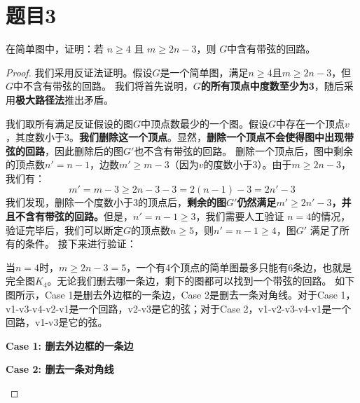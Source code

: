 \documentclass[utf8]{ctexart}
\theoremstyle{mystyle}
\begin{document}
\section*{题目3}
\begin{problembox}
在简单图中，证明：若 $ n \geq 4 $ 且 $ m \geq 2n -3 $，则 $ G $中含有带弦的回路。
\end{problembox}
\begin{proof}
我们采用反证法证明。假设$G$是一个简单图，满足$n \geq 4$且$m \geq 2n - 3$，但$G$中不含有带弦的回路。
我们将首先说明，\textbf{$G$的所有顶点中度数至少为3}，随后采用\textbf{极大路径法}推出矛盾。

我们取所有满足反证假设的图$G$中顶点数最少的一个图。假设$G$中存在一个顶点$v$，其度数小于3。\textbf{我们删除这一个顶点}。显然，\textbf{删除一个顶点不会使得图中出现带弦的回路}，因此删除后的图$ G' $也不含有带弦的回路。
删除一个顶点后，图中剩余的顶点数$n' = n-1$，边数$m' \geq m-3$（因为$v$的度数小于3）。由于$m \geq 2n - 3$，我们有：
\[
m' = m - 3 \geq 2n - 3 - 3 = 2(n-1) - 3 = 2n' - 3
\]
我们发现，删除一个度数小于3的顶点后，\textbf{剩余的图$ G' $仍然满足$m' \geq 2n' - 3$，并且不含有带弦的回路。}但是，$ n'=n-1 \geq 3 $，我们需要人工验证 $ n = 4$的情况，验证完毕后，我们可以断定$G$的顶点数$n \geq 5$，则$n' = n-1 \geq 4$，图$G'$ 满足了所有的条件。
接下来进行验证：

当$n=4$时，$m \geq 2n - 3 = 5$，一个有4个顶点的简单图最多只能有6条边，也就是完全图$K_4$。无论我们删去哪一条边，剩下的图都可以找到一个带弦的回路。
如下图所示，Case 1是删去外边框的一条边，Case 2是删去一条对角线。对于Case 1，v1-v3-v4-v2-v1是一个回路，v2-v3是它的弦；对于Case 2，v1-v2-v3-v4-v1是一个回路，v1-v3是它的弦。
\begin{center}
\textbf{Case 1: 删去外边框的一条边}


\bigskip

\textbf{Case 2: 删去一条对角线}

\end{center}
\end{proof}
\end{document}
